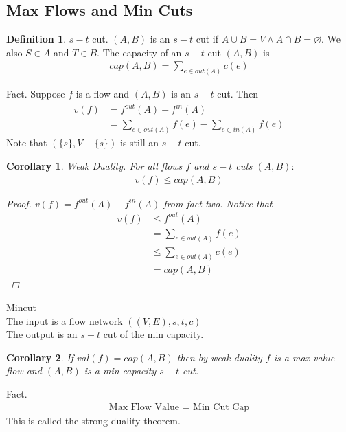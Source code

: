 \documentclass[a4paper]{article}
\theoremstyle{plain}
\newtheorem*{cor}{Corollary}
\theoremstyle{definition}
\newtheorem{defn}{Definition}[section]
\theoremstyle{remark}
\begin{document}
	\subsection{Max Flows and Min Cuts}
	\begin{defn}
		$s-t$ cut. $(A,B)$ is an $s-t$ cut if $A \cup B = V \land A \cap B = \varnothing$. We also $S \in A$ and $T \in B$. The capacity of an $s-t$ cut $(A,B)$ is 
		\begin{align*}
			cap(A,B) = \sum_{e \in out(A)}^{} c(e)
		\end{align*}
	\end{defn}
	Fact. Suppose $f$ is a flow and $(A,B)$ is an $s-t$ cut. Then
	\begin{align*}
		v(f) &= f^{out}(A) - f^{in}(A) \\
		     &= \sum_{e \in out(A)}^{} f(e) - \sum_{e\in in(A)}^{} f(e)
	\end{align*}
	Note that $(\{s\}, V-\{s\})$ is still an $s-t$ cut. 
	\begin{cor}
		Weak Duality. For all flows $f$ and $s-t$ cuts $(A,B):$ 
		\begin{align*}
			v(f) \le cap(A,B)
		\end{align*}
		\begin{proof}
			$v(f) = f^{out}(A) - f^{in}(A)$ from fact two. Notice that 
\begin{align*}
	v(f) &\le f^{out}(A) \\
	     &= \sum_{e \in out(A)}^{} f(e) \\
	& \le  \sum_{e \in out(A)}^{} c(e) \\
	&= cap(A,B)
\end{align*}
		\end{proof}
	\end{cor}
		Mincut\\
		The input is a flow network $((V,E),s,t,c)$ \\
		The output is an $s-t$ cut of the min capacity. \\
		\begin{cor}
			If $val(f) = cap(A,B)$ then by weak duality $f$ is a max value flow and $(A,B)$ is a min capacity $s-t$ cut.
		\end{cor}
		Fact.
		\begin{align*}
			\text{Max Flow Value } =\text{ Min Cut Cap}
		\end{align*}
		This is called the strong duality theorem. 
\end{document}
